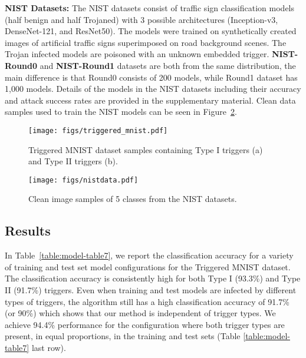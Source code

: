 \documentclass{article}
\begin{document}
\textbf{NIST Datasets:}
The NIST datasets consist of traffic sign classification models (half benign and half Trojaned) with 3 possible architectures (Inception-v3, DenseNet-121, and ResNet50). The models were trained on synthetically created images of artificial traffic signs superimposed on road background scenes. The Trojan infected models are poisoned with an unknown embedded trigger. \textbf{NIST-Round0} and \textbf{NIST-Round1} datasets are both from the same distribution, the main difference is that Round0 consists of 200 models, while Round1 dataset has 1,000 models. Details of the  models in the NIST datasets including their accuracy and attack success rates are provided in the supplementary material. Clean data samples used to train the NIST models can be seen in Figure~\ref{fig:NISTdata}.


\begin{figure}[h!]
\centering
\texttt{[image: figs/triggered\_mnist.pdf]}
\vspace{-3mm}
\caption{Triggered MNIST dataset samples containing Type I triggers (a) and Type II triggers (b).}
\label{fig:trigger}
\vspace{-3mm}
\end{figure}


\begin{figure}[h!]
\centering
\texttt{[image: figs/nistdata.pdf]}
\vspace{-3mm}
\caption{Clean image samples of 5 classes from the NIST datasets.}
\label{fig:NISTdata}
\vspace{-3mm}
\end{figure}








    













\vspace{-3mm}
\subsection{Results}
\vspace{-2mm}

In Table~\ref{table:model-table7}, we report the classification accuracy for a variety of training and test set model configurations for the Triggered MNIST dataset. The classification accuracy is consistently  high for both Type I (93.3\%) and Type II (91.7\%) triggers. Even when training and test models are infected by different types of triggers, the algorithm still has a high classification accuracy of 91.7\% (or 90\%) which shows that our method is independent of trigger types. We achieve 94.4\% performance for the configuration where both  trigger types are present, in equal proportions, in the training and test sets (Table \ref{table:model-table7} last row). 
\end{document}
